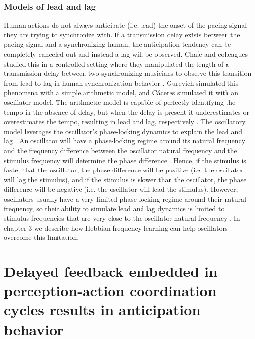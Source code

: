 \documentclass{report}
\begin{document}
\subsection{Models of lead and lag} 
Human actions do not always anticipate (i.e. lead) the onset of the pacing signal they are trying to synchronize with. If a transmission delay exists between the pacing signal and a synchronizing human, the anticipation tendency can be completely canceled out and instead a lag will be observed. Chafe and colleagues studied this in a controlled setting where they manipulated the length of a transmission delay between two synchronizing musicians to observe this transition from lead to lag in human synchronization behavior \cite{chafe2010effect}. Gurevich \cite{gurevish2004simulation} simulated this phenomena with a simple arithmetic model, and C\'{a}ceres \cite{caceres2013synchronization} simulated it with an oscillator model. The arithmetic model is capable of perfectly identifying the tempo in the absence of delay, but when the delay is present it underestimates or overestimates the tempo, resulting in lead and lag, respectively \cite{gurevish2004simulation}. The oscillatory model leverages the oscillator's phase-locking dynamics to explain the lead and lag \cite{caceres2013synchronization}. An oscillator will have a phase-locking regime around its natural frequency and the frequency difference between the oscillator natural frequency and the stimulus frequency will determine the phase difference \cite{kim2015signal}. Hence, if the stimulus is faster that the oscillator, the phase difference will be positive (i.e. the oscillator will lag the stimulus), and if the stimulus is slower than the oscillator, the phase difference will be negative (i.e. the oscillator will lead the stimulus). However, oscillators usually have a very limited phase-locking regime around their natural frequency, so their ability to simulate lead and lag dynamics is limited to stimulus frequencies that are very close to the oscillator natural frequency \cite{kim2015signal}. In chapter 3 we describe how Hebbian frequency learning can help oscillators overcome this limitation. 


\chapter{Delayed feedback embedded in perception-action coordination cycles results in anticipation behavior}
\end{document}
